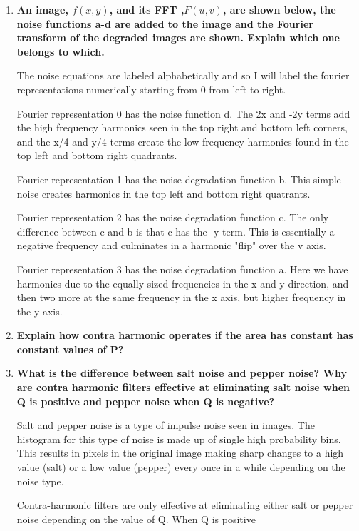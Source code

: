 \begin{enumerate}[font=\bfseries]
\begin{enumerate}[font=\bfseries, label=\alph*.]
    \end{enumerate}

    \item \textbf{An image, $f(x,y)$, and its FFT ,$F(u,v)$, are shown below,
    the noise functions a-d are added to the image and the Fourier transform of
    the degraded images are shown. Explain which one belongs to which.}

    The noise equations are labeled alphabetically and so I will label the
    fourier representations numerically starting from 0 from left to right. 

    Fourier representation 0 has the noise function d. The 2x and -2y terms add
    the high frequency harmonics seen in the top right and bottom left corners,
    and the x/4 and y/4 terms create the low frequency harmonics found in the
    top left and bottom right quadrants.

    Fourier representation 1 has the noise degradation function b. This simple
    noise creates harmonics in the top left and bottom right quatrants.

    Fourier representation 2 has the noise degradation function c. The only
    difference between c and b is that c has the -y term. This is essentially a
    negative frequency and culminates in a harmonic "flip" over the v axis.

    Fourier representation 3 has the noise degradation function a. Here we have
    harmonics due to the equally sized frequencies in the x and y direction, and
    then two more at the same frequency in the x axis, but higher frequency in
    the y axis.

    \item \textbf{Explain how contra harmonic operates if the area has constant
    has constant values of P?}

    

    \item \textbf{What is the difference between salt noise and pepper noise?
    Why are contra harmonic filters effective at eliminating salt noise when Q
    is positive and pepper noise when Q is negative?}

    Salt and pepper noise is a type of impulse noise seen in images. The
    histogram for this type of noise is made up of single high probability bins.
    This results in pixels in the original image making sharp changes to a high
    value (salt) or a low value (pepper) every once in a while depending on the
    noise type.

    Contra-harmonic filters are only effective at eliminating either salt or
    pepper noise depending on the value of Q. When Q is positive


\end{enumerate}

